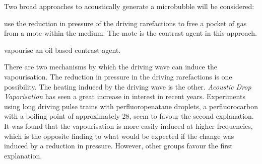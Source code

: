 Two broad approaches to acoustically generate a microbubble will be considered:
\nlist
{
\item use the reduction in pressure of the driving rarefactions to free a pocket of gas from a mote within the medium.
The mote is the contrast agent in this approach.
\item vapourise an oil based contrast agent.  

There are two mechanisms by which the driving wave can induce the vapourisation.
The reduction in pressure in the driving rarefactions is one possibility.
The heating induced by the driving wave is the other.
{\em Acoustic Drop Vaporisation} has seen a great increase in interest in recent years\cite{Lin2013}.
Experiments using long driving pulse trains with perfluoropenatane droplets,
a perfluorocarbon with a boiling point of approximately 28\degree\cite{Burns2010}, 
seem to favour the second explanation.
It was found that the vapourisation is more easily induced at higher frequencies\cite{Burns2010},
which is the opposite finding to what would be expected if the change was induced by a reduction in pressure. 
However, other groups favour the first explanation\cite{Kripfgans2000,Rapoport2007,Doinikov2014}.
}






